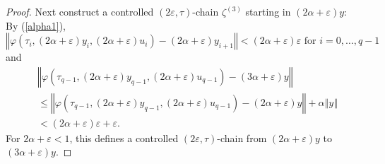\documentclass[10pt,a4paper]{amsart}
\begin{document}
\begin{proof}
Next construct a controlled $(2\varepsilon,\tau)$-chain $\zeta^{(3)}$ starting
in $(2\alpha+\varepsilon)y$: By (\ref{alpha1}),%
\[
\left\Vert \varphi(\tau_{i},(2\alpha+\varepsilon)y_{i},(2\alpha+\varepsilon
)u_{i})-(2\alpha+\varepsilon)y_{i+1}\right\Vert <(2\alpha+\varepsilon
)\varepsilon\text{ for }i=0,\ldots,q-1
\]
and%
\begin{align*}
&  \left\Vert \varphi(\tau_{q-1},(2\alpha+\varepsilon)y_{q-1},(2\alpha
+\varepsilon)u_{q-1})-(3\alpha+\varepsilon)y\right\Vert \\
&  \leq\left\Vert \varphi(\tau_{q-1},(2\alpha+\varepsilon)y_{q-1}%
,(2\alpha+\varepsilon)u_{q-1})-(2\alpha+\varepsilon)y\right\Vert
+\alpha\left\Vert y\right\Vert \\
&  <(2\alpha+\varepsilon)\varepsilon+\varepsilon.
\end{align*}
For $2\alpha+\varepsilon<1$, this defines a controlled $(2\varepsilon,\tau
)$-chain from $(2\alpha+\varepsilon)y$ to $(3\alpha+\varepsilon)y$.


\end{proof}
\end{document}

